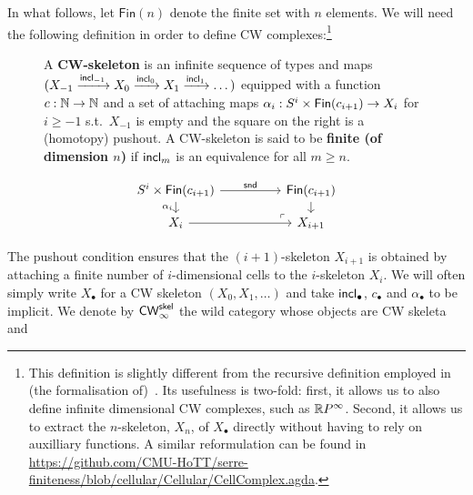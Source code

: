 \documentclass[a4page]{article}
\begin{document}
In what follows, let $\mathsf{Fin}(n)$ denote the finite
set with $n$ elements. We will need the following definition in order to define CW complexes:\footnote{This definition is slightly different from the
  recursive definition employed in (the formalisation
  of)~\cite{BuchholtzFavonia18}. Its usefulness is two-fold: first, it
  allows us to also define infinite dimensional CW complexes, such as
  $\textnormal{\ensuremath{\mathbb{R}P^\infty}}$. Second, it allows us to extract the $n$-skeleton,
  $X_n$, of $X_{\bullet}$ directly without having to rely on
  auxilliary functions. A similar reformulation can be found in \url{https://github.com/CMU-HoTT/serre-finiteness/blob/cellular/Cellular/CellComplex.agda}.}
%
\begin{figure}[H]
\begin{minipage}{0.65 \linewidth}
\begin{definition}[CW skeleta]
  A \textbf{CW-skeleton} is an infinite sequence of types and maps
  $(X_{-1} \xrightarrow{\textnormal{\ensuremath{\mathsf{incl}_{-1}}}} X_0 \xrightarrow{\textnormal{\ensuremath{\mathsf{incl}_{0}}}} X_1 \xrightarrow{\textnormal{\ensuremath{\mathsf{incl}_{1}}}} \dots )$
  equipped with a function $c : \textsf{$\mathbb{N}$} \to \textsf{$\mathbb{N}$}$ and a set of attaching maps $\alpha_i : S^i \times \textnormal{\ensuremath{\mathsf{Fin}({c_{i+1}})}} \to X_i$ for $i \geq -1$ s.t.\ $X_{-1}$ is empty and the square on the right is a (homotopy) pushout. A CW-skeleton is said to be \textbf{finite (of dimension $n$)} if $\textnormal{\ensuremath{\mathsf{incl}_{m}}}$ is
an equivalence for all $m \geq n$.
\end{definition}
\end{minipage}
\begin{minipage}{0.35 \linewidth}
  \[
\begin{tikzcd}[ampersand replacement=\& , row sep = small]
	{S^{i} \times \fin{c_{i+1}}} \&\& \fin{c_{i+1}} \\
	{X_i} \&\& {X_{i+1}}
	\arrow["{\mathsf{snd}}", from=1-1, to=1-3]
	\arrow["{\alpha_{i}}"', from=1-1, to=2-1]
	\arrow[from=2-1, to=2-3]
	\arrow[from=1-3, to=2-3]
	\arrow["\lrcorner"{anchor=center, pos=0.125, rotate=180}, draw=none, from=2-3, to=1-1]
\end{tikzcd}
\]
\end{minipage}
\end{figure}
%
The pushout condition ensures that the \( (i+1) \)-skeleton \( X_{i+1} \) is
obtained by attaching a finite number of \( i \)-dimensional cells to the
\( i \)-skeleton \( X_i \).
%
We will often simply write $X_\bullet$ for a CW skeleton $(X_0,X_1,\dots)$ and
take $\textnormal{\ensuremath{\mathsf{incl}_{\bullet}}}$, $c_{\bullet}$ and $ \alpha_{\bullet}$ to be implicit.
%
We denote by $\textnormal{\ensuremath{\mathsf{CW}_\infty^{\mathsf{skel}}}}$ the wild category whose objects are CW skeleta and
\end{document}
